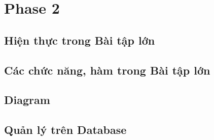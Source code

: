 \section{Phase 2}
\subsection*{Hiện thực trong Bài tập lớn}

\subsection{Các chức năng, hàm trong Bài tập lớn}
\subsection{Diagram}

\subsection{Quản lý trên Database}
